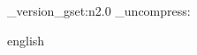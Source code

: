 \xspaceaddexceptions{\sidenote}

\ExplSyntaxOn
\pdf_version_gset:n{2.0}
\pdf_uncompress: %
\ExplSyntaxOff

\captionsetup[figure]{labelformat=linked}

\begin{hyphenrules}{english}
\end{hyphenrules}
\usepackage[framed=true]{kaotheorems}

\usepackage{kaorefs}

\graphicspath{ {./img/}{./} } %


\makeglossaries %




